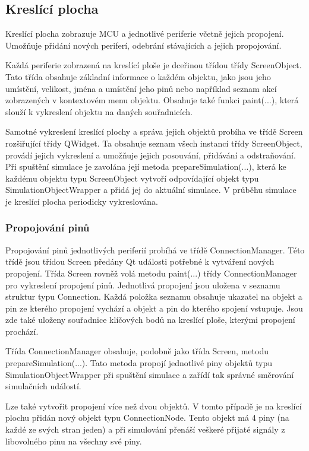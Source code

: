 \subsection{Kreslící plocha}
\label{kreslici_plocha}

Kreslící plocha zobrazuje MCU a jednotlivé periferie včetně jejich propojení. Umožňuje přidání nových periferí, odebrání stávajících a jejich propojování.

Každá periferie zobrazená na kreslící ploše je dceřinou třídou třídy ScreenObject. Tato třída obsahuje základní informace o každém objektu, jako jsou jeho umístění, velikost, jména a umístění jeho pinů nebo například seznam akcí zobrazených v kontextovém menu objektu. Obsahuje také funkci paint(...), která slouží k vykreslení objektu na daných souřadnicích.

Samotné vykreslení kreslící plochy a správa jejich objektů probíha ve třídě Screen rozšiřující třídy QWidget. Ta obsahuje seznam všech instancí třídy ScreenObject, provádí jejich vykreslení a umožňuje jejich posouvání, přidávání a odstraňování. Při spuštění simulace je zavolána její metoda prepareSimulation(...), která ke každému objektu typu ScreenObject vytvoří odpovídající objekt typu SimulationObjectWrapper a přidá jej do aktuální simulace. V průběhu simulace je kreslící plocha periodicky vykreslována.

\subsubsection{Propojování pinů}

Propojování pinů jednotlivých periferií probíhá ve třídě ConnectionManager. Této třídě jsou třídou Screen předány Qt události potřebné k vytváření nových propojení. Třída Screen rovněž volá metodu paint(...) třídy ConnectionManager pro vykreslení propojení pinů. Jednotlivá propojení jsou uložena v seznamu struktur typu Connection. Každá položka seznamu obsahuje ukazatel na objekt a pin ze kterého propojení vychází a objekt a pin do kterého spojení vstupuje. Jsou zde také uloženy souřadnice klíčových bodů na kreslící ploše, kterými propojení prochází.

Třída ConnectionManager obsahuje, podobně jako třída Screen, metodu prepareSimulation(...). Tato metoda propojí jednotlivé piny objektů typu SimulationObjectWrapper při spuštění simulace a zařídí tak správné směrování simulačních událostí.

Lze také vytvořit propojení více než dvou objektů. V tomto případě je na kreslící plochu přidán nový objekt typu ConnectionNode. Tento objekt má 4 piny (na každé ze svých stran jeden) a při simulování přenáší veškeré přijaté signály z libovolného pinu na všechny své piny.

